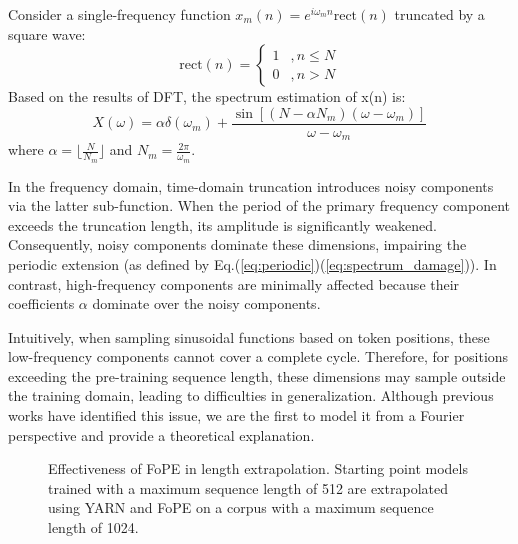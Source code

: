 Consider a single-frequency function $x_m(n)=e^{i\omega_m n}\text{rect}(n)$ truncated by a square wave:
\begin{equation}
    \text{rect}(n)=
    \left\{
        \begin{array}{cc}
            1 & ,n \leq N \\
            0 & ,n > N
        \end{array}
    \right.
\end{equation}
Based on the results of DFT, the spectrum estimation of x(n) is\footnotemark[1]:
\begin{equation}
    X(\omega) = \alpha\delta(\omega_m)+ \frac{\sin[(N-\alpha N_m)(\omega-\omega_m)]}{\omega-\omega_m}
    \label{eq:undertrained}
\end{equation}
where $\alpha=\lfloor\frac{N}{N_m}\rfloor$ and $N_m=\frac{2\pi}{\omega_m}$. 

In the frequency domain, time-domain truncation introduces noisy components via the latter sub-function. When the period of the primary frequency component exceeds the truncation length, its amplitude is significantly weakened. Consequently, noisy components dominate these dimensions, impairing the periodic extension (as defined by Eq.(\ref{eq:periodic})(\ref{eq:spectrum_damage})). 
In contrast, high-frequency components are minimally affected because their coefficients $\alpha$ dominate over the noisy components.

Intuitively, when sampling sinusoidal functions based on token positions, these low-frequency components cannot cover a complete cycle. Therefore, for positions exceeding the pre-training sequence length, these dimensions may sample outside the training domain, leading to difficulties in generalization. Although previous works \citep{peng2023yarn} have identified this issue, we are the first to model it from a Fourier perspective and provide a theoretical explanation.

\begin{figure*}[ht]
    \hfill
    \caption{Effectiveness of FoPE in length extrapolation. Starting point models trained with a maximum sequence length of 512 are extrapolated using YARN and FoPE on a corpus with a maximum sequence length of 1024.}
    \label{fig:length-extrapolation}
\end{figure*}

